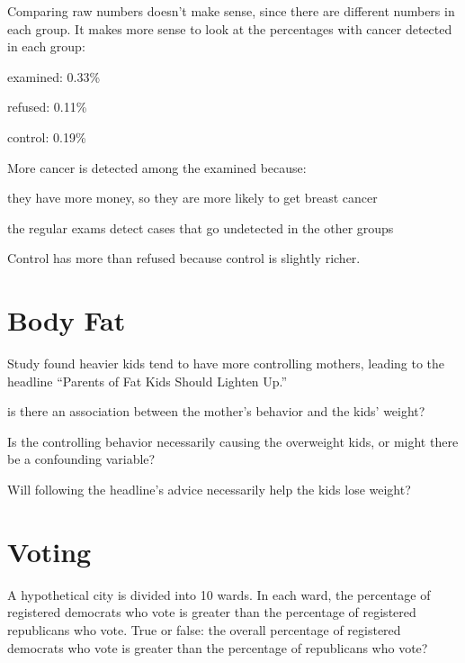 \documentclass[landscape]{exam}
\begin{document}
\begin{itemize*}
      \begin{solution}
        Comparing raw numbers doesn't make sense, since there are different
        numbers in each group.  It makes more sense to look at the percentages
        with cancer detected in each group:
        \begin{itemize*}
          \item examined: 0.33\%
          \item refused: 0.11\%
          \item control: 0.19\%
        \end{itemize*}

        More cancer is detected among the examined because:
        \begin{itemize*}
          \item they have more money, so they are more likely to get breast
            cancer
          \item the regular exams detect cases that go undetected in the other
            groups
        \end{itemize*}

        Control has more than refused because control is slightly richer.
      \end{solution}

  \end{itemize*}

  \section{Body Fat}
  Study found heavier kids tend to have more controlling mothers, leading to the
  headline ``Parents of Fat Kids Should Lighten Up.''

  \begin{itemize*}
    \item is there an association between the mother's behavior and the kids'
      weight?
    \item Is the controlling behavior necessarily causing the overweight kids,
      or might there be a confounding variable?
    \item Will following the headline's advice necessarily help the kids lose
      weight?
  \end{itemize*}

  \section{Voting}
  A hypothetical city is divided into 10 wards.  In each ward, the percentage of
  registered democrats who vote is greater than the percentage of registered
  republicans who vote.  True or false: the overall percentage of registered
  democrats who vote is greater than the percentage of republicans who vote?
\end{document}
